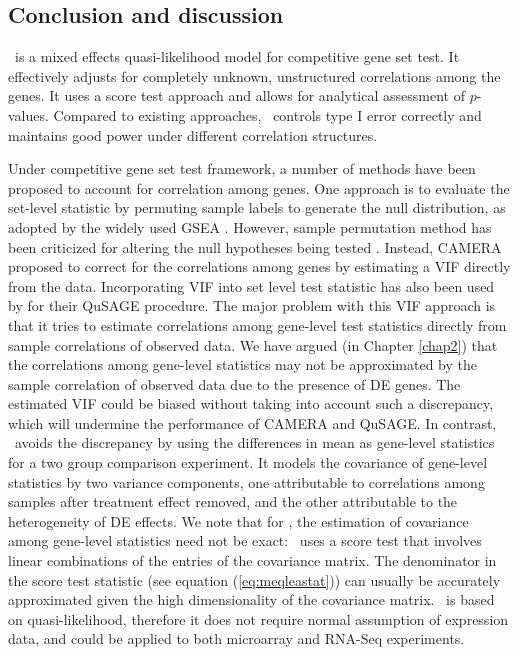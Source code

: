 	\subsection{Conclusion and discussion}\label{section:conclusion}
	
	 \OurMethod~is a mixed effects quasi-likelihood model for competitive gene set 
	test. It effectively adjusts for completely unknown, unstructured correlations among the genes. 
	It uses a score test approach and allows for analytical assessment of $p$-values. Compared to 
	existing approaches, \OurMethod~controls type I error correctly and maintains good power under 
	different correlation structures.  
	
	Under competitive gene set test framework, a number of methods have been
	proposed to account for correlation among genes. One approach is to evaluate the set-level 
	statistic by permuting sample labels to generate the null distribution, as adopted by the 
	widely used GSEA \citep{subramanian2005gene}. However, sample permutation method has been 
	criticized for altering the null hypotheses being tested \citep{goeman2007analyzing, 
	khatri2012ten}. Instead, CAMERA \citep{wu2012camera} proposed to correct for the correlations 
	among genes by estimating a VIF	directly from the data. Incorporating VIF into set level test 
	statistic has also been used by \citet{yaari2013quantitative} for their QuSAGE procedure. The 
	major problem with this VIF	approach is that it tries to estimate correlations
	among gene-level test statistics directly from sample correlations of observed data. We have
	argued (in Chapter \ref{chap2}) that the correlations among gene-level statistics may not be 
	approximated by the sample correlation of observed data due to the presence of DE genes. The 
	estimated VIF could be biased without taking into account such a discrepancy, which will 
	undermine the performance of CAMERA and QuSAGE. In contrast, \OurMethod~avoids the discrepancy 
	by using the differences in mean as gene-level statistics for a two group comparison 
	experiment. It models the covariance of gene-level statistics by two variance components, one 
	attributable to correlations among samples after treatment effect 
	removed, and the other attributable to the heterogeneity of DE effects. We note that for	
	\OurMethod, the estimation of covariance among gene-level statistics need not be exact:
	\OurMethod~uses a score test that involves linear combinations of the entries of the covariance
	matrix. The denominator in the score test statistic (see equation (\ref{eq:meqleastat})) can 
	usually be accurately approximated given the high dimensionality of the covariance matrix. 
	\OurMethod~is based on quasi-likelihood, therefore it does not require normal assumption of 
	expression data, and could be applied to both microarray and RNA-Seq experiments. 
	
